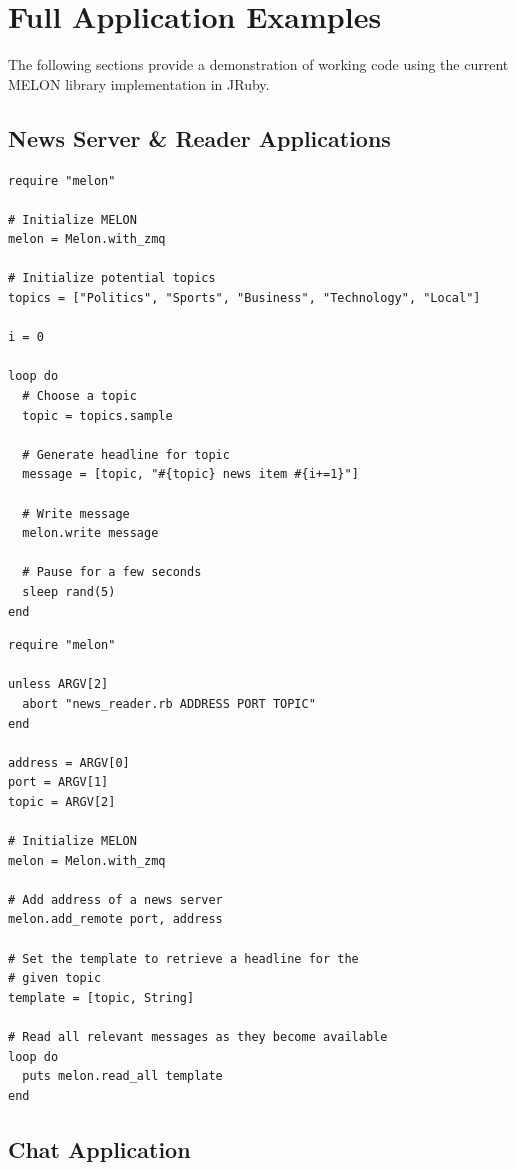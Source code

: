 \appendix
\chapter{Full Application Examples}

The following sections provide a demonstration of working code using the current MELON library implementation in JRuby.

\section{News Server \& Reader Applications}

\begin{lstlisting}[caption={News Reader}, label={code:newsserverfull}]
require "melon"

# Initialize MELON
melon = Melon.with_zmq

# Initialize potential topics
topics = ["Politics", "Sports", "Business", "Technology", "Local"]

i = 0

loop do
  # Choose a topic
  topic = topics.sample
  
  # Generate headline for topic
  message = [topic, "#{topic} news item #{i+=1}"]
  
  # Write message
  melon.write message
  
  # Pause for a few seconds
  sleep rand(5)
end
\end{lstlisting}


\begin{lstlisting}[caption={News Reader}, label={code:newsreaderfull}]
require "melon"

unless ARGV[2]
  abort "news_reader.rb ADDRESS PORT TOPIC"
end

address = ARGV[0]
port = ARGV[1]
topic = ARGV[2]

# Initialize MELON
melon = Melon.with_zmq

# Add address of a news server
melon.add_remote port, address

# Set the template to retrieve a headline for the
# given topic
template = [topic, String]

# Read all relevant messages as they become available
loop do
  puts melon.read_all template
end
\end{lstlisting}

\section{Chat Application}

